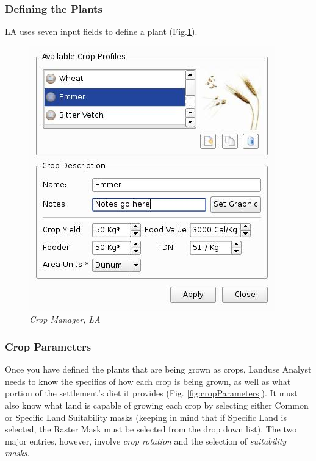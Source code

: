     \subsubsection{Defining the Plants}LA uses seven input fields to define a
      plant (Fig.\ref{fig:cropManager}).

\begin{figure}[htbp]
  \includegraphics[scale=.6]{./images/cropManager.jpg}
  \caption{\label{fig:cropManager}\textit{Crop Manager, LA}}
\end{figure}

    \subsubsection{Crop Parameters}
    \label{cropParameters}
      Once you have defined the plants that are being grown as crops, Landuse
      Analyst needs to know the specifics of how each crop is being grown, as
      well as what portion of the settlement's diet it provides (Fig.
      \ref{fig:cropParameters}).  It must also know what land is capable of
      growing each crop by selecting either Common or Specific Land Suitability masks
      (keeping in mind that if Specific Land is selected, the Raster Mask must
      be selected from the drop down list).  The two major entries, however,
      involve \textit{crop rotation} and the selection of \textit{suitability masks}.

